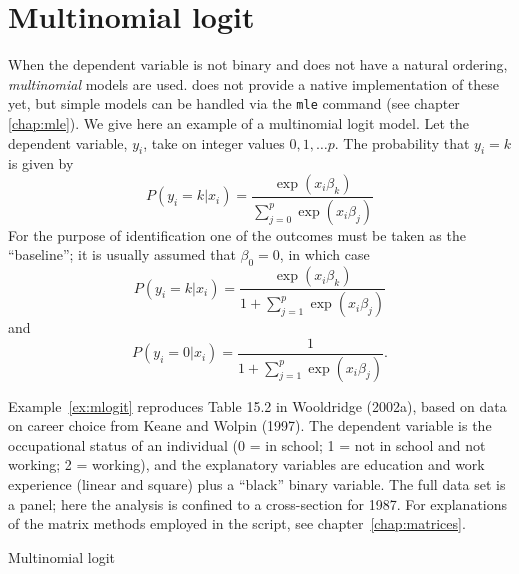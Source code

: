 \section{Multinomial logit}
\label{sec:mlogit}

When the dependent variable is not binary and does not have a natural
ordering, \emph{multinomial} models are used.  does not
provide a native implementation of these yet, but simple models can be
handled via the \texttt{mle} command (see chapter \ref{chap:mle}). We
give here an example of a multinomial logit model.  Let the dependent
variable, $y_i$, take on integer values $0,1,\dots p$.  The
probability that $y_i = k$ is given by
\[
  P(y_i = k |  x_i) = \frac{\exp(x_i \beta_k)}{\sum_{j=0}^p \exp(x_i \beta_j)}
\]
For the purpose of identification one of the outcomes must be taken as
the ``baseline''; it is usually assumed that $\beta_0 = 0$, in which case
\[
  P(y_i = k |  x_i) = \frac{\exp(x_i \beta_k)}{1 + \sum_{j=1}^p \exp(x_i \beta_j)} 
\]
and
\[
  P(y_i = 0 |  x_i) = \frac{1}{1 + \sum_{j=1}^p \exp(x_i \beta_j)} .
\]

Example~\ref{ex:mlogit} reproduces Table 15.2 in Wooldridge (2002a),
based on data on career choice from Keane and Wolpin (1997).  The
dependent variable is the occupational status of an individual (0 = in
school; 1 = not in school and not working; 2 = working), and the
explanatory variables are education and work experience (linear and
square) plus a ``black'' binary variable.  The full data set is a
panel; here the analysis is confined to a cross-section for 1987.  For
explanations of the matrix methods employed in the script, see
chapter~\ref{chap:matrices}.

\begin{script}[htbp]
  \caption{Multinomial logit}
  \label{ex:mlogit}
\end{script}


